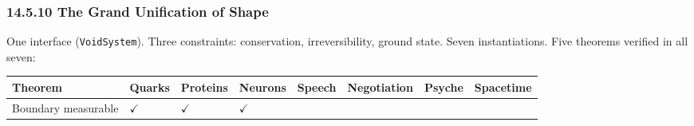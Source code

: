 \documentclass[
  11pt,
]{article}
\newcounter{none} %
\begin{document}
\subsubsection{14.5.10 The Grand Unification of
Shape}\label{the-grand-unification-of-shape}

One interface (\texttt{VoidSystem}). Three constraints: conservation,
irreversibility, ground state. Seven instantiations. Five theorems
verified in all seven:

{\def\LTcaptype{none} %
\begin{longtable}[]{@{}
  >{\raggedright\arraybackslash}p{}
  >{\centering\arraybackslash}p{}
  >{\centering\arraybackslash}p{}
  >{\centering\arraybackslash}p{}
  >{\centering\arraybackslash}p{}
  >{\centering\arraybackslash}p{}
  >{\centering\arraybackslash}p{}
  >{\centering\arraybackslash}p{}@{}}
\toprule\noalign{}
\begin{minipage}[b]{\linewidth}\raggedright
Theorem
\end{minipage} & \begin{minipage}[b]{\linewidth}\centering
Quarks
\end{minipage} & \begin{minipage}[b]{\linewidth}\centering
Proteins
\end{minipage} & \begin{minipage}[b]{\linewidth}\centering
Neurons
\end{minipage} & \begin{minipage}[b]{\linewidth}\centering
Speech
\end{minipage} & \begin{minipage}[b]{\linewidth}\centering
Negotiation
\end{minipage} & \begin{minipage}[b]{\linewidth}\centering
Psyche
\end{minipage} & \begin{minipage}[b]{\linewidth}\centering
Spacetime
\end{minipage} \\
\midrule\noalign{}
\endhead
\bottomrule\noalign{}
\endlastfoot
Boundary measurable & \(\checkmark\) & \(\checkmark\) & \(\checkmark\) &

\end{longtable}}
\end{document}
